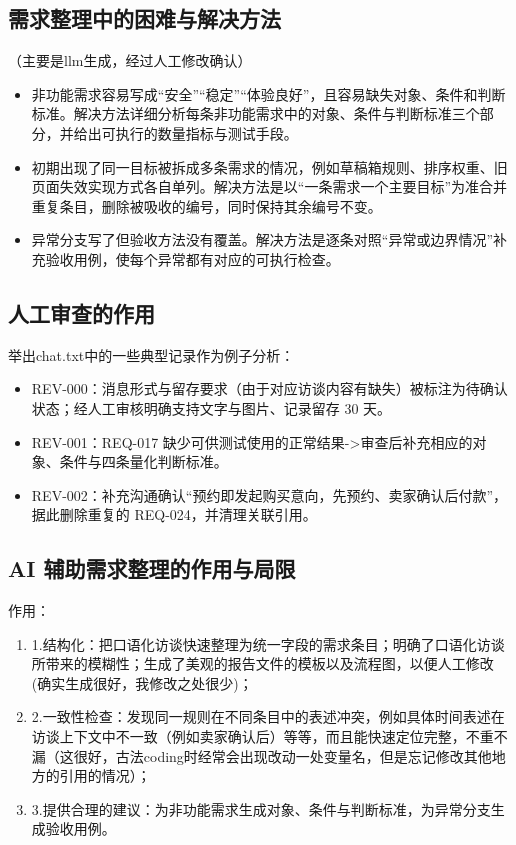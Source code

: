 \documentclass[UTF8,a4paper,zihao=-4]{ctexart}
\begin{document}
\subsection{需求整理中的困难与解决方法}
（主要是llm生成，经过人工修改确认）
\begin{itemize}
  \item 非功能需求容易写成“安全”“稳定”“体验良好”，且容易缺失对象、条件和判断标准。解决方法详细分析每条非功能需求中的对象、条件与判断标准三个部分，并给出可执行的数量指标与测试手段。
  \item 初期出现了同一目标被拆成多条需求的情况，例如草稿箱规则、排序权重、旧页面失效实现方式各自单列。解决方法是以“一条需求一个主要目标”为准合并重复条目，删除被吸收的编号，同时保持其余编号不变。
  \item 异常分支写了但验收方法没有覆盖。解决方法是逐条对照“异常或边界情况”补充验收用例，使每个异常都有对应的可执行检查。
\end{itemize}


\subsection{人工审查的作用}

举出chat.txt中的一些典型记录作为例子分析：

\begin{itemize}
  \item REV-000：消息形式与留存要求（由于对应访谈内容有缺失）被标注为待确认状态；经人工审核明确支持文字与图片、记录留存 30 天。
  \item REV-001：REQ-017 缺少可供测试使用的正常结果->审查后补充相应的对象、条件与四条量化判断标准。
  \item REV-002：补充沟通确认“预约即发起购买意向，先预约、卖家确认后付款”，据此删除重复的 REQ-024，并清理关联引用。
\end{itemize}


\subsection{AI 辅助需求整理的作用与局限}
作用：
\begin{enumerate}
  \item 1.结构化：把口语化访谈快速整理为统一字段的需求条目；明确了口语化访谈所带来的模糊性；生成了美观的报告文件的模板以及流程图，以便人工修改(确实生成很好，我修改之处很少)；
  \item 2.一致性检查：发现同一规则在不同条目中的表述冲突，例如具体时间表述在访谈上下文中不一致（例如卖家确认后）等等，而且能快速定位完整，不重不漏（这很好，古法coding时经常会出现改动一处变量名，但是忘记修改其他地方的引用的情况）；
  \item 3.提供合理的建议：为非功能需求生成对象、条件与判断标准，为异常分支生成验收用例。
\end{enumerate}
\end{document}
